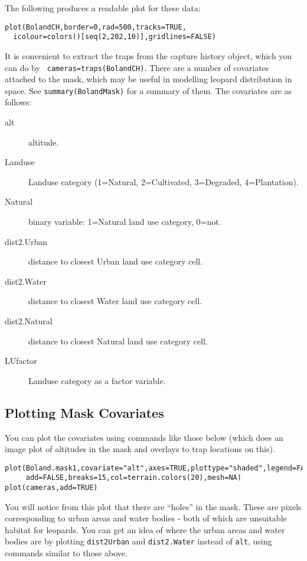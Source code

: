 \noindent
The following produces a readable plot for these data:

\begin{verbatim}
plot(BolandCH,border=0,rad=500,tracks=TRUE,
  icolour=colors()[seq(2,202,10)],gridlines=FALSE)
\end{verbatim}

It is convenient to extract the traps from the capture history object, which you can do by \texttt{ cameras=traps(BolandCH)}. There are a number of covariates attached to the mask, which may be useful in modelling leopard distribution in space. See \texttt{summary(BolandMask)} for a summary of them. The covariates are as follows:

\begin{description}
\item[alt] altitude.
\item[Landuse] Landuse category (1=Natural, 2=Cultivated, 3=Degraded, 4=Plantation).
\item[Natural] binary variable: 1=Natural land use category, 0=not.
\item[dist2.Urban] distance to closest Urban land use category cell.
\item[dist2.Water] distance to closest Water land use category cell.
\item[dist2.Natural] distance to closest Natural land use category cell.
\item[LUfactor] Landuse category as a factor variable.
\end{description}

\subsection*{Plotting Mask Covariates}

You can plot the covariates using commands like those below (which does an image plot of altitudes in the mask and overlays to trap locations on this).

\begin{verbatim}
plot(Boland.mask1,covariate="alt",axes=TRUE,plottype="shaded",legend=FALSE,
     add=FALSE,breaks=15,col=terrain.colors(20),mesh=NA)
plot(cameras,add=TRUE)
\end{verbatim}

\noindent
You will notice from this plot that there are ``holes'' in the mask. These are pixels corresponding to urban areas and water bodies - both of which are unsuitable habitat for leopards. You can get an idea of where the urban areas and water bodies are by plotting \texttt{dist2Urban} and \texttt{dist2.Water} instead of \texttt{alt}, using commands similar to those above. 


